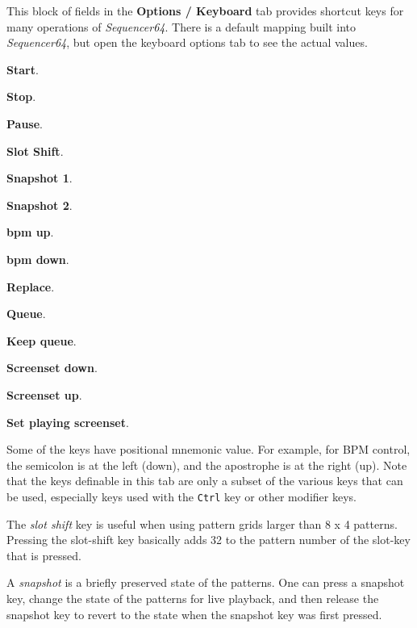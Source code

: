    This block of fields in the \textbf{Options / Keyboard} tab
   provides shortcut keys for many operations of
   \textsl{Sequencer64}.  There is a default mapping built into
   \textsl{Sequencer64}, but open the keyboard options tab to see
   the actual values.
   

   \begin{enumber}
      \item \textbf{Start}.
      \item \textbf{Stop}.
      \item \textbf{Pause}.
      \item \textbf{Slot Shift}.
      \item \textbf{Snapshot 1}.
      \item \textbf{Snapshot 2}.
      \item \textbf{bpm up}.
      \item \textbf{bpm down}.
      \item \textbf{Replace}.
      \item \textbf{Queue}.
      \item \textbf{Keep queue}.
      \item \textbf{Screenset down}.
      \item \textbf{Screenset up}.
      \item \textbf{Set playing screenset}.
   \end{enumber}

   Some of the keys have positional mnemonic value.  For example,
   for BPM control, the semicolon is at the left (down), and the apostrophe
   is at the right (up).
   Note that the keys definable in this tab are only a subset of the
   various keys that can be used, especially keys used with the
   \texttt{Ctrl} key or other modifier keys.

   The \textsl{slot shift} key is useful when using pattern grids larger
   than 8 x 4 patterns.  Pressing the slot-shift key basically adds 32 to the
   pattern number of the slot-key that is pressed.

   A \textsl{snapshot} is a briefly preserved state of the patterns.
   One can press a snapshot key, change the state of the patterns for live
   playback, and then release the snapshot key to revert to the state when
   the snapshot key was first pressed.

